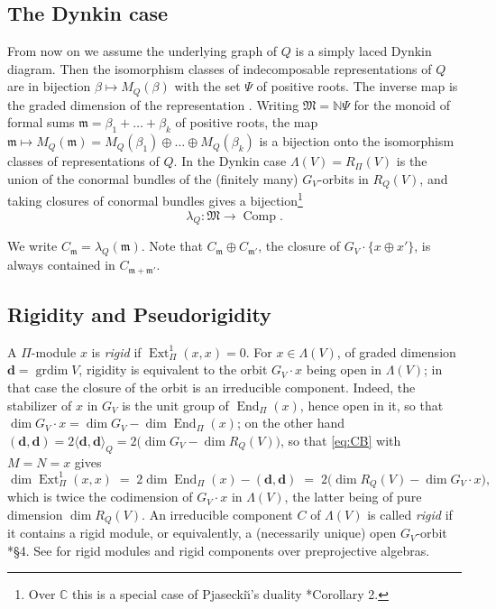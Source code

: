 \documentclass[12pt]{article}
\def\xspace{ }%
\theoremstyle{definition}
\newcommand{\Prigity}{Pseudorigidity\xspace}
\newcommand{\NN}{\mathbb{N}}
\newcommand{\CC}{\mathbb{C}}
\newcommand{\bd}{\boldsymbol{d}}  %
\newcommand{\Ext}{\operatorname{Ext}}
\newcommand{\End}{\operatorname{End}}
\newcommand{\grdim}{\operatorname{grdim}}
\newcommand{\Comp}{\operatorname{Comp}}
\newcommand{\cmp}{C}                       %
\newcommand{\Mfr}{\mathfrak{M}}
\newcommand{\mm}{\mathfrak{m}}
\begin{document}
\subsection{The Dynkin case}\label{ssec:dynkin}

From now on we assume the underlying graph of $Q$ is a simply laced Dynkin diagram. Then
the isomorphism classes of indecomposable representations of $Q$ are in bijection
$\beta\mapsto M_Q(\beta)$ with the set $\Psi$ of positive roots.
The inverse map is the graded dimension of the representation \cites{MR0332887,MR0393065}.
Writing $\Mfr = \NN\Psi$ for the monoid of
formal sums $\mm = \beta_1 + \dots + \beta_k$ of positive roots, the map $\mm
\mapsto M_Q(\mm) = M_Q(\beta_1)\oplus\dots\oplus M_Q(\beta_k)$ is a bijection
onto the isomorphism classes of representations of $Q$. In the Dynkin case
$\Lambda(V) = R_\Pi(V)$ is the union of the conormal bundles of the (finitely
many) $G_V$-orbits in $R_Q(V)$, and taking closures of conormal bundles gives
a bijection\footnote{Over $\CC$ this is a special case of Pjasecki{\u\i}'s duality
\cite{MR0390138}*{Corollary 2}.}
\[
   \lambda_Q : \Mfr \longrightarrow \Comp.
\]

We write $\cmp_\mm = \lambda_Q(\mm)$. Note that $\cmp_{\mm}\oplus \cmp_{\mm'}$, the
closure of $G_V\cdot\{x\oplus x'\}$, is always contained in $\cmp_{\mm+\mm'}$.

\subsection{Rigidity and \texorpdfstring{\Prigity}{Pseudorigidity}}\label{ssec:prig}

A $\Pi$-module $x$ is \emph{rigid} if $\Ext^1_\Pi(x,x) = 0$. For $x \in
\Lambda(V)$, of graded dimension $\bd = \grdim V$, rigidity is equivalent
to the orbit $G_V\cdot x$ being open in $\Lambda(V)$; in that case the
closure of the orbit is an irreducible component. Indeed, the stabilizer of
$x$ in $G_V$ is the unit group of $\End_\Pi(x)$, hence open in it, so that
$\dim G_V\cdot x = \dim G_V - \dim\End_\Pi(x)$; on the other hand
$(\bd,\bd) = 2\langle\bd,\bd\rangle_Q = 2\bigl(\dim G_V - \dim R_Q(V)\bigr)$,
so that \eqref{eq:CB} with $M = N = x$ gives
\begin{equation}\label{eq:extcodim}
   \dim\Ext^1_\Pi(x,x) \;=\; 2\dim\End_\Pi(x) - (\bd,\bd)
   \;=\; 2\bigl(\dim R_Q(V) - \dim G_V\cdot x\bigr) ,
\end{equation}
which is twice the codimension of $G_V\cdot x$ in $\Lambda(V)$, the latter
being of pure dimension $\dim R_Q(V)$. An
irreducible component $\cmp$ of $\Lambda(V)$ is called \emph{rigid} if it
contains a rigid module, or equivalently, a (necessarily unique) open $G_V$-orbit
\cite{MR4847234}*{\S4}. See \cite{MR2242628} for rigid modules and rigid
components over preprojective algebras.
\end{document}
